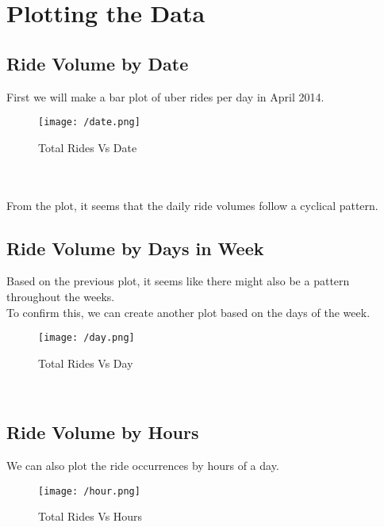 \documentclass[fleqn]{report}
\begin{document}
	\section{Plotting the Data}
	\subsection{Ride Volume by Date}
	First we will make a bar plot of uber rides per day in April 2014.
	\begin{figure}[!ht]
		\centering
		\texttt{[image: /date.png]}
		\caption{Total Rides Vs Date}
		\label{fig:date}
	\end{figure}\\\\
	From the plot, it seems that the daily ride volumes follow a cyclical pattern.
	\subsection{Ride Volume by Days in Week}
	Based on the previous plot, it seems like there might also be a pattern throughout the weeks.\\
	To confirm this, we can create another plot based on the days of the week.
	\begin{figure}[!ht]
		\centering
		\texttt{[image: /day.png]}
		\caption{Total Rides Vs Day}
		\label{fig:day}
	\end{figure}\\
	\subsection{Ride Volume by Hours}
	We can also plot the ride occurrences by hours of a day.
	\begin{figure}[!ht]
		\centering
		\texttt{[image: /hour.png]}
		\caption{Total Rides Vs Hours}
		\label{fig:hours}
	\end{figure}\\
\end{document}
